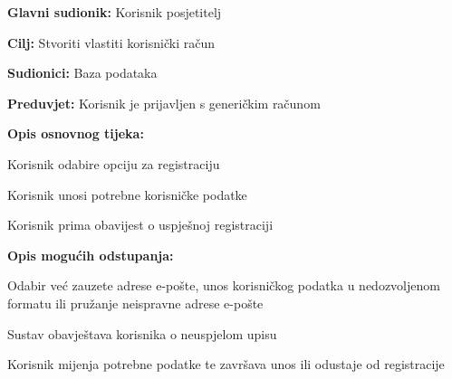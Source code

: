 					\noindent {}
					\begin{packed_item}
						
						\item \textbf{Glavni sudionik: } Korisnik posjetitelj
						\item  \textbf{Cilj:} Stvoriti vlastiti korisnički račun
						\item  \textbf{Sudionici:} Baza podataka
						\item  \textbf{Preduvjet:} Korisnik je prijavljen s generičkim računom
						\item  \textbf{Opis osnovnog tijeka:}
						
						\item[] \begin{packed_enum}
							
							\item Korisnik odabire opciju za registraciju
							\item Korisnik unosi potrebne korisničke podatke
							\item Korisnik prima obavijest o uspješnoj registraciji
							
						\end{packed_enum}
						
						\item  \textbf{Opis mogućih odstupanja:}
						
						\item[] \begin{packed_item}
							
							\item[2.a] Odabir već zauzete adrese e-pošte, unos korisničkog podatka u nedozvoljenom formatu ili pružanje neispravne adrese e-pošte
							\item[] \begin{packed_enum}
								
								\item Sustav obavještava korisnika o neuspjelom upisu
								\item Korisnik mijenja potrebne podatke te završava unos ili odustaje od registracije
								
							\end{packed_enum}
							
						\end{packed_item}
					\end{packed_item}
					
